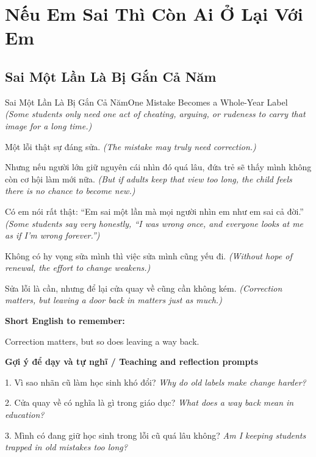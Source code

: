 \chapter{Nếu Em Sai Thì Còn Ai Ở Lại Với Em}

\section{Sai Một Lần Là Bị Gắn Cả Năm}
\begin{truyen}{Sai Một Lần Là Bị Gắn Cả Năm}{One Mistake Becomes a Whole-Year Label}
\textit{(Some students only need one act of cheating, arguing, or rudeness to carry that image for a long time.)}

Một lỗi thật sự đáng sửa.
\textit{(The mistake may truly need correction.)}

Nhưng nếu người lớn giữ nguyên cái nhìn đó quá lâu, đứa trẻ sẽ thấy mình không còn cơ hội làm mới nữa.
\textit{(But if adults keep that view too long, the child feels there is no chance to become new.)}

Có em nói rất thật: “Em sai một lần mà mọi người nhìn em như em sai cả đời.”
\textit{(Some students say very honestly, “I was wrong once, and everyone looks at me as if I'm wrong forever.”)}

Không có hy vọng sửa mình thì việc sửa mình cũng yếu đi.
\textit{(Without hope of renewal, the effort to change weakens.)}

\end{truyen}

\begin{baihoc}
Sửa lỗi là cần, nhưng để lại cửa quay về cũng cần không kém.
\textit{(Correction matters, but leaving a door back in matters just as much.)}
\end{baihoc}

\begin{ghinhoanh}
\textbf{Short English to remember:}

Correction matters, but so does leaving a way back.

\end{ghinhoanh}

\begin{tuhocnhanh}
\textbf{Gợi ý để dạy và tự nghĩ / Teaching and reflection prompts}

1. Vì sao nhãn cũ làm học sinh khó đổi? \textit{Why do old labels make change harder?}

2. Cửa quay về có nghĩa là gì trong giáo dục? \textit{What does a way back mean in education?}

3. Mình có đang giữ học sinh trong lỗi cũ quá lâu không? \textit{Am I keeping students trapped in old mistakes too long?}
\end{tuhocnhanh}
\ngancach

